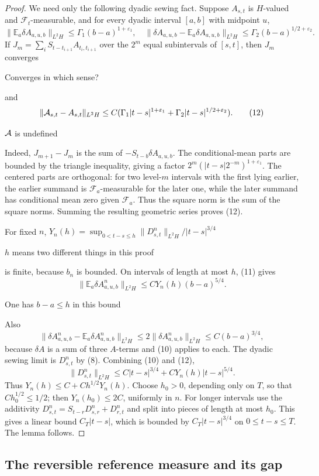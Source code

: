 \documentclass[12pt]{article}
\newcommand{\E}{\mathbb E}
\newcommand{\1}{\mathbf 1}
\newcommand{\calF}{\mathcal F}
\newcommand{\review}[1]{\begin{reviewbox}#1\end{reviewbox}}
\begin{document}
\begin{proof}
We need only the following dyadic sewing fact.  Suppose \(A_{s,t}\) is
\(H\)-valued and \(\calF_t\)-measurable, and for every dyadic interval
\([a,b]\) with midpoint \(u\),
\[
\|\E_a\delta A_{a,u,b}\|_{L^2H}\le \Gamma_1(b-a)^{1+\varepsilon_1},\quad
\|\delta A_{a,u,b}-\E_a\delta A_{a,u,b}\|_{L^2H}
        \le \Gamma_2(b-a)^{1/2+\varepsilon_2}.
\]
If \(J_m=\sum_iS_{t-t_{i+1}}A_{t_i,t_{i+1}}\) over the \(2^m\) equal
subintervals of \([s,t]\), then \(J_m\) converges 
\review{
Converges in which sense?
}
and
\[
 \|{\cal A}_{s,t}-A_{s,t}\|_{L^2H}
 \le C(\Gamma_1|t-s|^{1+\varepsilon_1}
       +\Gamma_2|t-s|^{1/2+\varepsilon_2}).                 \tag{12}
\]
\review{${\cal A}$ is undefined}
Indeed, \(J_{m+1}-J_m\) is the sum of
\(-S_{t-b}\delta A_{a,u,b}\).  The conditional-mean parts are bounded by the
triangle inequality, giving a factor
\(2^m(|t-s|2^{-m})^{1+\varepsilon_1}\).  The centered parts are orthogonal:
for two level-\(m\) intervals with the first lying earlier, the earlier
summand is \(\calF_a\)-measurable for the later one, while the later summand
has conditional mean zero given \(\calF_a\).  Thus the square norm is the sum
of the square norms.  Summing the resulting geometric series proves (12).

For fixed \(n\), \(Y_n(h)=\sup_{0<t-s\le h}\|D^n_{s,t}\|_{L^2H}/|t-s|^{3/4}\)
\review{$h$ means two different things in this proof}
is finite, because \(b_n\) is bounded.  On intervals of length at most \(h\),
(11) gives
\[
 \|\E_a\delta A^n_{a,u,b}\|_{L^2H}\le C Y_n(h)(b-a)^{5/4}.
\]
\review{One has $b-a \leq h$ in this bound}
Also
\[
\|\delta A^n_{a,u,b}-\E_a\delta A^n_{a,u,b}\|_{L^2H}
 \le 2\|\delta A^n_{a,u,b}\|_{L^2H}
 \le C(b-a)^{3/4},
\]
because \(\delta A\) is a sum of three \(A\)-terms and (10) applies to each.
The dyadic sewing limit is \(D^n_{s,t}\) by (8).  Combining (10) and (12),
\[
 \|D^n_{s,t}\|_{L^2H}\le C|t-s|^{3/4}
        +C Y_n(h)|t-s|^{5/4}.
\]
Thus \(Y_n(h)\le C+Ch^{1/2}Y_n(h)\).  Choose \(h_0>0\), depending only on
\(T\), so that \(Ch_0^{1/2}\le1/2\); then \(Y_n(h_0)\le2C\), uniformly in
\(n\).  For longer intervals use the additivity
\(D^n_{s,t}=S_{t-r}D^n_{s,r}+D^n_{r,t}\) and split into pieces of length at
most \(h_0\).  This gives a linear bound \(C_T|t-s|\), which is bounded by
\(C_T|t-s|^{3/4}\) on \(0\le t-s\le T\).  The lemma follows.
\end{proof}

\subsection*{The reversible reference measure and its gap}
\end{document}
